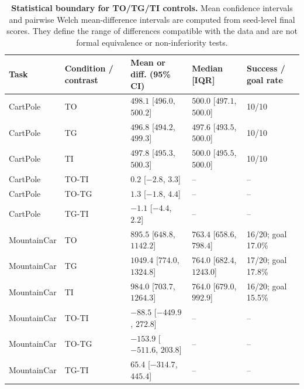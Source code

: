 \begin{table}[H]
\centering
\footnotesize
\caption{\textbf{Statistical boundary for TO/TG/TI controls.} Mean confidence intervals and pairwise Welch mean-difference intervals are computed from seed-level final scores. They define the range of differences compatible with the data and are not formal equivalence or non-inferiority tests.}
\label{tab:supp-stat-boundary}
\begin{tabularx}{\textwidth}{@{}llYYY@{}}
\toprule
\textbf{Task} & \textbf{Condition / contrast} & \textbf{Mean or diff. (95\% CI)} & \textbf{Median [IQR]} & \textbf{Success / goal rate} \\
\midrule
CartPole & TO & $498.1$ [$496.0$, $500.2$] & $500.0$ [$497.1$, $500.0$] & 10/10 \\
CartPole & TG & $496.8$ [$494.2$, $499.3$] & $497.6$ [$493.5$, $500.0$] & 10/10 \\
CartPole & TI & $497.8$ [$495.3$, $500.3$] & $500.0$ [$495.5$, $500.0$] & 10/10 \\
CartPole & TO-TI & $0.2$ [$-2.8$, $3.3$] & -- & -- \\
CartPole & TO-TG & $1.3$ [$-1.8$, $4.4$] & -- & -- \\
CartPole & TG-TI & $-1.1$ [$-4.4$, $2.2$] & -- & -- \\
\midrule
MountainCar & TO & $895.5$ [$648.8$, $1142.2$] & $763.4$ [$658.6$, $798.4$] & 16/20; goal 17.0\% \\
MountainCar & TG & $1049.4$ [$774.0$, $1324.8$] & $764.0$ [$682.4$, $1243.0$] & 17/20; goal 17.8\% \\
MountainCar & TI & $984.0$ [$703.7$, $1264.3$] & $764.0$ [$679.0$, $992.9$] & 16/20; goal 15.5\% \\
MountainCar & TO-TI & $-88.5$ [$-449.9$, $272.8$] & -- & -- \\
MountainCar & TO-TG & $-153.9$ [$-511.6$, $203.8$] & -- & -- \\
MountainCar & TG-TI & $65.4$ [$-314.7$, $445.4$] & -- & -- \\
\bottomrule
\end{tabularx}
\end{table}
